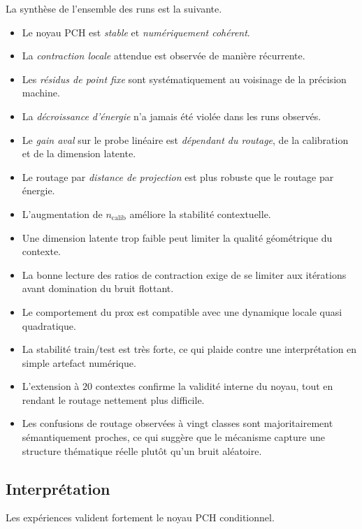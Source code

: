 \documentclass[11pt,a4paper]{article}
\newcommand{\1}{\mathbf 1}
\begin{document}
La synthèse de l’ensemble des runs est la suivante.

\begin{itemize}[leftmargin=2em]
    \item Le noyau PCH est \emph{stable} et \emph{numériquement cohérent}.
    \item La \emph{contraction locale} attendue est observée de manière récurrente.
    \item Les \emph{résidus de point fixe} sont systématiquement au voisinage de la précision machine.
    \item La \emph{décroissance d’énergie} n’a jamais été violée dans les runs observés.
    \item Le \emph{gain aval} sur le probe linéaire est \emph{dépendant du routage}, de la calibration et de la dimension latente.
    \item Le routage par \emph{distance de projection} est plus robuste que le routage par énergie.
    \item L’augmentation de \(n_{\mathrm{calib}}\) améliore la stabilité contextuelle.
    \item Une dimension latente trop faible peut limiter la qualité géométrique du contexte.
    \item La bonne lecture des ratios de contraction exige de se limiter aux itérations avant domination du bruit flottant.
    \item Le comportement du prox est compatible avec une dynamique locale quasi quadratique.
    \item La stabilité train/test est très forte, ce qui plaide contre une interprétation en simple artefact numérique.
    \item L’extension à \(20\) contextes confirme la validité interne du noyau, tout en rendant le routage nettement plus difficile.
    \item Les confusions de routage observées à vingt classes sont majoritairement sémantiquement proches, ce qui suggère que le mécanisme capture une structure thématique réelle plutôt qu’un bruit aléatoire.
\end{itemize}

\subsection{Interprétation}

Les expériences valident fortement le noyau PCH conditionnel.
\end{document}
